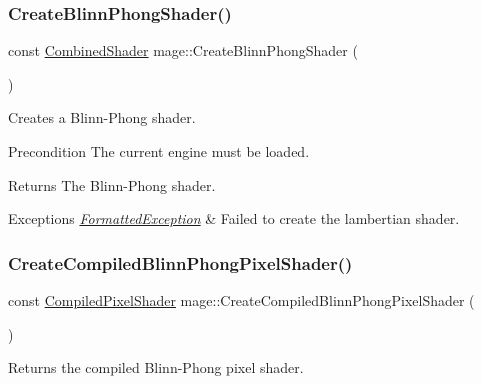 \hypertarget{namespacemage_a783f8a6abdb9fa4c530734ae660b6b03}{}\label{namespacemage_a783f8a6abdb9fa4c530734ae660b6b03} 
\subsubsection{\texorpdfstring{Create\+Blinn\+Phong\+Shader()}{CreateBlinnPhongShader()}}
{\footnotesize\ttfamily const \hyperlink{structmage_1_1_combined_shader}{Combined\+Shader} mage\+::\+Create\+Blinn\+Phong\+Shader (\begin{DoxyParamCaption}{ }\end{DoxyParamCaption})}

Creates a Blinn-\/\+Phong shader.

\begin{DoxyPrecond}{Precondition}
The current engine must be loaded. 
\end{DoxyPrecond}
\begin{DoxyReturn}{Returns}
The Blinn-\/\+Phong shader. 
\end{DoxyReturn}

\begin{DoxyExceptions}{Exceptions}
{\em \hyperlink{structmage_1_1_formatted_exception}{Formatted\+Exception}} & Failed to create the lambertian shader. \\
\hline
\end{DoxyExceptions}
\hypertarget{namespacemage_a0540fe531beb5bc292f29a6953a32939}{}\label{namespacemage_a0540fe531beb5bc292f29a6953a32939} 
\subsubsection{\texorpdfstring{Create\+Compiled\+Blinn\+Phong\+Pixel\+Shader()}{CreateCompiledBlinnPhongPixelShader()}}
{\footnotesize\ttfamily const \hyperlink{structmage_1_1_compiled_pixel_shader}{Compiled\+Pixel\+Shader} mage\+::\+Create\+Compiled\+Blinn\+Phong\+Pixel\+Shader (\begin{DoxyParamCaption}{ }\end{DoxyParamCaption})}

Returns the compiled Blinn-\/\+Phong pixel shader.

